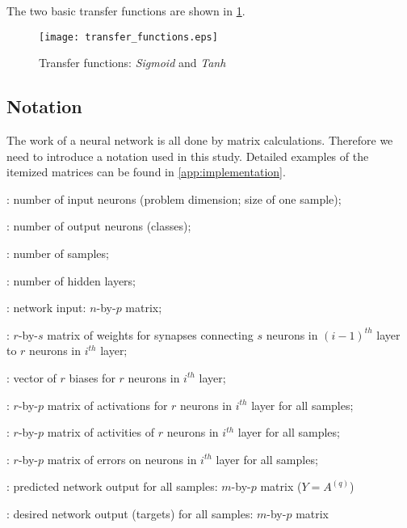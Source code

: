 The two basic transfer functions are shown in \cref{fig:methods:transfer_functions}.

\begin{figure}[H]
  \centering
  \texttt{[image: transfer\_functions.eps]}
  \caption{Transfer functions: \textit{Sigmoid} and \textit{Tanh}}
  \label{fig:methods:transfer_functions}
\end{figure}

\subsection*{Notation}
The work of a neural network is all done by matrix calculations. Therefore we need to introduce a notation used in this study. Detailed examples of the itemized matrices can be found in \cref{app:implementation}.

\begin{description}[leftmargin=!,labelwidth=\widthof{\bfseries $ W^{(i)} $}]
\item[$ n $] : number of input neurons (problem dimension; size of one sample);
\item[$ m $] : number of output neurons (classes);
\item[$ p $] : number of samples;
\item[$ q $] : number of hidden layers;
\item[$ X $] : network input: $ n $-by-$ p $ matrix;
\item[$ W^{(i)} $] : $ r $-by-$ s $ matrix of weights for synapses connecting $ s $ neurons in $ (i-1)^{th} $ layer to $ r $ neurons in $ i^{th} $ layer;
\item[$ B^{(i)} $] : vector of $ r $ biases for $ r $ neurons in $ i^{th} $ layer;
\item[$ Z^{(i)} $] : $ r $-by-$ p $ matrix of activations for $ r $ neurons in $ i^{th} $ layer for all samples;
\item[$ A^{(i)} $] : $ r $-by-$ p $ matrix of activities of $ r $ neurons in $ i^{th} $ layer for all samples;
\item[$ \Delta^{(i)} $] : $ r $-by-$ p $ matrix of errors on neurons in $ i^{th} $ layer for all samples;
\item[$ Y $] : predicted network output for all samples: $ m $-by-$ p $ matrix ($ Y = A^{(q)} $)
\item[$ U $] : desired network output (targets) for all samples: $ m $-by-$ p $ matrix
\end{description}

